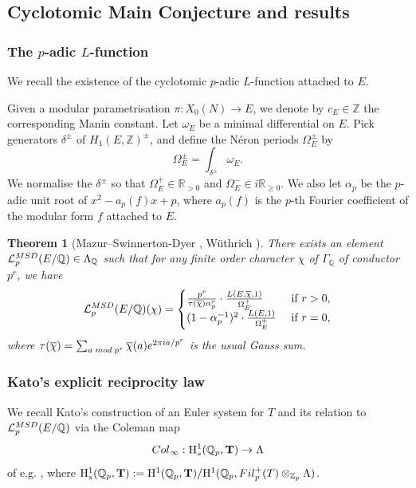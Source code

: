 \documentclass[10pt,reqno]{amsart}
\numberwithin{equation}{section}
\theoremstyle{plain}
\newtheorem{thm}{Theorem}[subsection] %
\theoremstyle{definition}
\theoremstyle{definition}
\theoremstyle{plain}
\theoremstyle{plain}
\theoremstyle{plain}
\theoremstyle{plain}
\theoremstyle{plain}
\theoremstyle{plain}
\newcommand{\Z}{\mathbb{Z}}
\newcommand{\Q}{\mathbb{Q}}
\newcommand{\R}{\mathbb{R}}
\newcommand{\Lcal}{\mathcal{L}}
\newcommand{\rH}{\mathrm{H}}
\begin{document}
\subsection{Cyclotomic Main Conjecture and results}  

\subsubsection{The $p$-adic $L$-function} 

We recall the existence of the cyclotomic $p$-adic $L$-function attached to  $E$. 

Given a modular parametrisation $\pi:X_0(N)\rightarrow E$, we denote by $c_E\in\Z$ the corresponding Manin constant. Let $\omega_E$ be a minimal differential on $E$. Pick generators $\delta^\pm$ of $H_1(E,\Z)^\pm$, and define the Néron periods $\Omega_E^\pm$ by 
\[
\Omega_E^\pm=\int_{\delta^\pm}\omega_E.
\]
We normalise the $\delta^\pm$ so that $\Omega_E^+\in\R_{>0}$ and $\Omega_E^-\in i\R_{\geq 0}$.
We also let $\alpha_p$ be the $p$-adic unit root of $x^2-a_p(f)x+p$, where $a_p(f)$ is the $p$-th Fourier coefficient of the modular form $f$ attached to $E$.

\begin{thm}[Mazur--Swinnerton-Dyer \cite{M-SwD}, W\"uthrich \cite{wuthrich-int}]\label{thm:MSDpadicL}
There exists an element $\Lcal^{\rm MSD}_p(E/\Q)\in\Lambda_\Q$ such that for any finite order character $\chi$ of $\Gamma_\Q$ of conductor $p^r$, we have
\[
\Lcal^{\rm MSD}_p(E/\Q)(\chi)=\begin{cases}
\frac{p^r}{\tau(\overline{\chi})\alpha_p^r}\cdot\frac{L(E,\overline{\chi},1)}{\Omega_E^+} &\text{ if }r>0,\\
(1-\alpha_p^{-1})^2\cdot\frac{ L(E,1)}{\Omega_E^+} &\text{ if }r=0,
\end{cases}
\]
where $\tau(\overline{\chi})=\sum_{a\;{\rm mod}\;p^r}\overline{\chi}(a)e^{2\pi ia/p^r}$ is the usual Gauss sum.
\end{thm}

\subsubsection{Kato's explicit reciprocity law}%
We recall Kato's construction of an Euler system for $T$ and its relation to $\mathcal{L}_p^{\rm MSD}(E/\Q)$ via the Coleman map
\[
{\rm Col}_\infty:\rH^1_{s}(\Q_p,\mathbf{T})
\rightarrow\Lambda
\]
of e.g. \cite[Appendix]{rubindurham}, where $\rH^1_{s}(\Q_p,\mathbf{T}):=\rH^1(\Q_p,\mathbf{T})/\rH^1(\Q_p,{\rm Fil}_p^+(T)\otimes_{\Z_p}\Lambda)$.
\end{document}
